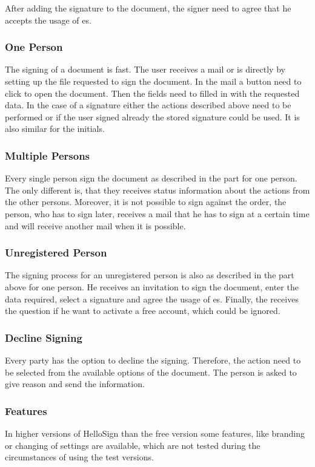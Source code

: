 After adding the signature to the document, the signer need to agree that he accepts the usage of \gls{es}.

\subsubsection{One Person}
The signing of a document is fast. The user receives a mail or is directly by setting up the file requested to sign the document. In the mail a button need to click to open the document. Then the fields need to filled in with the requested data. In the case of a signature either the actions described above need to be performed or if the user signed already the stored signature could be used. It is also similar for the initials.

\subsubsection{Multiple Persons}
Every single person sign the document as described in the part for one person. The only different is, that they receives status information about the actions from the other persons. Moreover, it is not possible to sign against the order, the person, who has to sign later, receives a mail that he has to sign at a certain time and will receive another mail when it is possible.

\subsubsection{Unregistered Person}
The signing process for an unregistered person is also as described in the part above for one person. He receives an invitation to sign the document, enter the data required, select a signature and agree the usage of \gls{es}. Finally, the receives the question if he want to activate a free account, which could be ignored.

\subsubsection{Decline Signing}
Every party has the option to decline the signing. Therefore, the action need to be selected from the available options of the document. The person is asked to give reason and send the information.

\subsubsection{Features}
In higher versions of HelloSign than the free version some features, like branding or changing of settings are available, which are not tested during the circumstances of using the test versions. 

